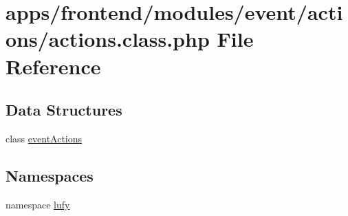 \hypertarget{frontend_2modules_2event_2actions_2actions_8class_8php}{\section{apps/frontend/modules/event/actions/actions.class.\-php File Reference}
\label{frontend_2modules_2event_2actions_2actions_8class_8php}
}
\subsection*{Data Structures}
\begin{DoxyCompactItemize}
\item 
class \hyperlink{classevent_actions}{event\-Actions}
\end{DoxyCompactItemize}
\subsection*{Namespaces}
\begin{DoxyCompactItemize}
\item 
namespace \hyperlink{namespacelufy}{lufy}
\end{DoxyCompactItemize}
